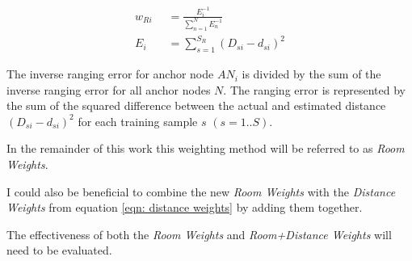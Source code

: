 \begin{equation}
\begin{split}
w_{Ri}\;\; & =\frac{E_i^{-1}}{\sum_{n=1}^{N}{E_n^{-1}}}\\
E_i\;\; & = \sum_{s=1}^{S_R}{(D_{si}-d_{si})^2}
\end{split}
\label{eqn: Room Weights}
\end{equation}

The inverse ranging error for anchor node $AN_i$ is divided by the sum of the inverse ranging error for all anchor nodes $N$. The ranging error is represented by the sum of the squared difference between the actual and estimated distance $(D_{si}-d_{si})^2$ for each training sample $s$ $(s=1..S)$.

In the remainder of this work this weighting method will be referred to as \emph{Room Weights}.

I could also be beneficial to combine the new \emph{Room Weights} with the \emph{Distance Weights} from equation \ref{eqn: distance weights} by adding them together.


The effectiveness of both the \emph{Room Weights} and \emph{Room+Distance Weights} will need to be evaluated.